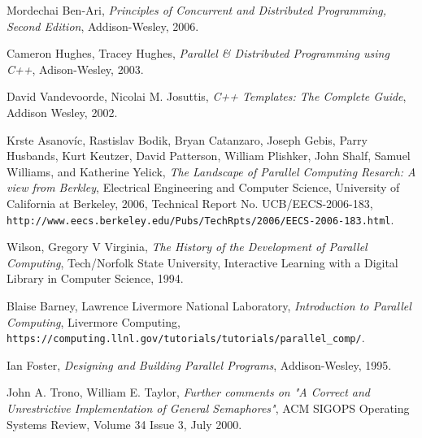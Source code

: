 
\begin{thebibliography}{99}

 Mordechai Ben-Ari, \textit{Principles of Concurrent and Distributed Programming,
  Second Edition}, Addison-Wesley, 2006.

 Cameron Hughes, Tracey Hughes, \textit{Parallel \& Distributed Programming using C++},
  Adison-Wesley, 2003.

 David Vandevoorde, Nicolai M. Josuttis, \textit{C++ Templates: The Complete Guide},
  Addison Wesley, 2002.

 Krste Asanovíc, Rastislav Bodik, Bryan Catanzaro, Joseph Gebis,
  Parry Husbands, Kurt Keutzer, David Patterson,
  William Plishker, John Shalf, Samuel Williams, and Katherine Yelick,
  \textit{The Landscape of Parallel Computing Resarch: A view from Berkley},
  Electrical Engineering and Computer Science, University of California at Berkeley, 2006,
  Technical Report No. UCB/EECS-2006-183,
  \texttt{http://www.eecs.berkeley.edu/Pubs/TechRpts/2006/EECS-2006-183.html}.

 Wilson, Gregory V Virginia, \textit{The History of the Development of Parallel Computing}, Tech/Norfolk State University, Interactive Learning with a Digital Library in Computer Science, 1994.

 Blaise Barney, Lawrence Livermore National Laboratory, \textit{Introduction to Parallel Computing}, Livermore Computing, \texttt{https://computing.llnl.gov/tutorials/tutorials/parallel\_comp/}.

 Ian Foster, \textit{Designing and Building Parallel Programs}, Addison-Wesley, 1995.

 John A. Trono,	William E. Taylor, \textit{Further comments on "A Correct and Unrestrictive Implementation of General Semaphores"}, ACM SIGOPS Operating Systems Review, Volume 34 Issue 3, July 2000.

\end{thebibliography}